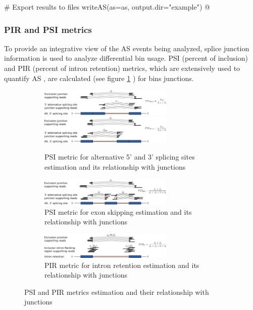 \documentclass{article}
\begin{document}
# Export results to files
writeAS(as=as, output.dir="example")
@

\subsubsection{ PIR and PSI metrics } \label{sec:psir}
To provide an integrative view of the AS events being analyzed, splice junction
information is used to analyze differential bin usage. PSI (percent of
inclusion) and PIR (percent of intron retention) metrics, which are extensively
used to quantify AS \cite{pmid21057496}, are calculated (see figure
\ref{fig:pirEq} ) for bins junctions. 

\begin{figure}[ht!]
    \begin{subfigure}[t]{1\textwidth}
    \centering
      \includegraphics[width=0.7\textwidth]{images/psi5ss.pdf}
      \includegraphics[width=0.7\textwidth]{images/psi3ss.pdf}      
      \caption{PSI metric for alternative 5' and 3' splicing sites estimation and its relationship with junctions}
    \end{subfigure}
    \begin{subfigure}[t]{1\textwidth}
    \centering
      \includegraphics[width=0.7\textwidth]{images/psies.pdf}
      \caption{PSI metric for exon skipping estimation and its relationship with
      junctions}
    \end{subfigure}
    \begin{subfigure}[t]{1\textwidth}
      \centering
      \includegraphics[width=0.7\textwidth]{images/pir.pdf}
      \caption{PIR metric for intron retention estimation and its relationship
      with junctions}
    \end{subfigure}    
    \caption{PSI and PIR metrics estimation and their relationship with
    junctions}
    \label{fig:pirEq}
\end{figure}
\end{document}
